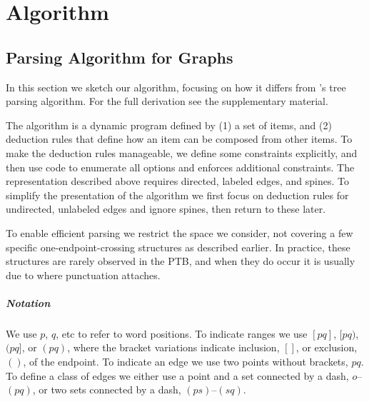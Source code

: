 \chapter{Algorithm}

\newlength\vertSmall
\newlength\vertBig
\newlength\vertBigger
\newlength{}
\newlength\coordGap

\newenvironment{tightflushright}{
  \null\hfill
}{
}

\section{Parsing Algorithm for Graphs}


In this section we sketch our algorithm, focusing on how it differs from \textcite{ec}'s tree parsing algorithm.
For the full derivation see the supplementary material.

The algorithm is a dynamic program defined by (1) a set of items, and (2) deduction rules that define how an item can be composed from other items.
To make the deduction rules manageable, we define some constraints explicitly, and then use code to enumerate all options and enforces additional constraints.
The representation described above requires directed, labeled edges, and spines.
To simplify the presentation of the algorithm we first focus on deduction rules for undirected, unlabeled edges and ignore spines, then return to these later.

To enable efficient parsing we restrict the space we consider, not covering a few specific one-endpoint-crossing structures as described earlier.
In practice, these structures are rarely observed in the PTB, and when they do occur it is usually due to where punctuation attaches.

\paragraph{Notation}
We use $p$, $q$, etc to refer to word positions.
To indicate ranges we use $[pq]$, $[pq)$, $(pq]$, or $(pq)$, where the bracket variations indicate inclusion, $[]$, or exclusion, $()$, of the endpoint.
To indicate an edge we use two points without brackets, \myeg $pq$.
To define a class of edges we either use a point and a set connected by a dash, \myeg $o$--$(pq)$, or two sets connected by a dash, \myeg $(ps)$--$(sq)$.

